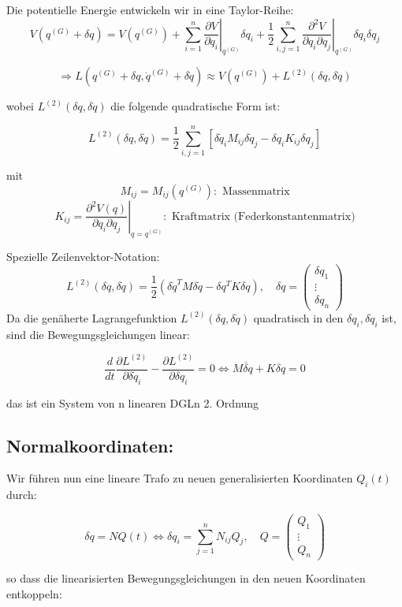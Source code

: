 \documentclass[10pt, letterpaper]{article}
\newcommand{\Q}{\mathbb{Q}}
\begin{document}
Die potentielle Energie entwickeln wir in eine Taylor-Reihe:
\[V(q^{(G)}+\delta q)=V(q^{(G)})+\sum_{i=1}^n\left.\frac{\partial V}{\partial q_i}\right|_{q^{(G)}}\delta q_i+\frac{1}{2}\sum_{i,j=1}^n\left.\frac{\partial^2V}{\partial q_i\partial q_j}\right|_{q^{(G)}}\delta q_i\delta q_j\]

\[\Rightarrow L(q^{(G)}+\delta q,\dot{q}^{(G)}+\delta\dot{q})\approx V(q^{(G)})+L^{(2)}(\delta q,\delta\dot{q})\]

wobei $L^{(2)}(\delta q,\delta\dot{q})$ die folgende quadratische Form ist:

\[L^{(2)}(\delta q,\delta\dot{q})=\frac{1}{2}\sum_{i,j=1}^n[\delta\dot{q}_i M_{ij}\delta\dot{q}_j-\delta q_i K_{ij}\delta q_j]\]

mit \[M_{ij}=M_{ij}(q^{(G)}): \text{ Massenmatrix}\]
\[K_{ij}=\left.\frac{\partial^2V(q)}{\partial q_i\partial q_j}\right|_{q=q^{(G)}}: \text{ Kraftmatrix (Federkonstantenmatrix)}\]

Spezielle Zeilenvektor-Notation:
\[L^{(2)}(\delta q,\delta\dot{q})=\frac{1}{2}(\delta\dot{q}^T M\delta\dot{q}-\delta q^T K\delta q),\quad \delta q=\begin{pmatrix}\delta q_1\\\vdots\\\delta q_n\end{pmatrix}\]
Da die genäherte Lagrangefunktion $L^{(2)}(\delta q, \delta\dot{q})$ quadratisch in den $\delta q_i, \delta\dot{q}_i$ ist, sind die Bewegungsgleichungen linear:

\[\frac{d}{dt}\frac{\partial L^{(2)}}{\partial\delta\dot{q}_i}-\frac{\partial L^{(2)}}{\partial\delta q_i}=0 \Leftrightarrow M\ddot{\delta q}+K\delta q=0\]

das ist ein System von n linearen DGLn 2. Ordnung

\subsection*{Normalkoordinaten:}

Wir führen nun eine lineare Trafo zu neuen generalisierten Koordinaten $Q_i(t)$ durch:

\[\delta q = N Q(t) \Leftrightarrow \delta q_i=\sum_{j=1}^n N_{ij}Q_j, \quad Q = \begin{pmatrix}Q_1\\\vdots\\Q_n\end{pmatrix}\]

so dass die linearisierten Bewegungsgleichungen in den neuen Koordinaten entkoppeln:
\end{document}
